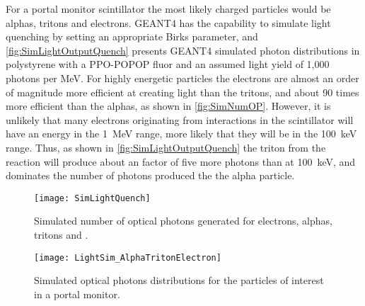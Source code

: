 For a portal monitor scintillator the most likely charged particles would be alphas, tritons and electrons.
GEANT4 has the capability to simulate light quenching by setting an appropriate Birks parameter, and \autoref{fig:SimLightOutputQuench} presents GEANT4 simulated photon distributions in polystyrene with a PPO-POPOP fluor and an assumed light yield of 1,000 photons per MeV.
For highly energetic particles the electrons are almost an order of magnitude more efficient at creating light than the tritons, and about 90 times more efficient than the alphas, as shown in \autoref{fig:SimNumOP}.
However, it is unlikely that many electrons originating from  interactions in the scintillator will have an energy in the \SI{1}{\MeV} range, more likely that they will be in the \SI{100}{\keV} range.
Thus, as shown in \autoref{fig:SimLightOutputQuench} the triton from the  reaction will produce about an factor of five more photons than at \SI{100}{\keV}, and dominates the number of photons produced the the alpha particle.
\begin{figure}
  \centering
    \texttt{[image: SimLightQuench]}
    \caption[Simulated Number of Optical Photons for Various Ions and Energies]{Simulated number of optical photons generated for electrons, alphas, tritons and .\LightQuenchSimGeo}
	\label{fig:SimNumOP}
  \end{figure}
  \begin{figure}
	\centering
    \texttt{[image: LightSim\_AlphaTritonElectron]}
  \caption[GEANT4 simulated light output of alpha, tritons and electrons in polystyrene]{Simulated optical photons distributions for the particles of interest in a portal monitor. \LightQuenchSimGeo}
  \label{fig:SimLightOutputQuench}
\end{figure}

